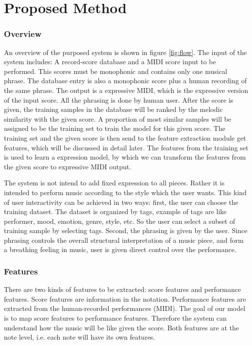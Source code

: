 \chapter{Proposed Method}
\subsection{Overview}
An overview of the purposed system is shown in figure \ref{fig:flow}. The input of the system includes: A record-score database and a MIDI score input to be performed. This scores must be monophonic and contains only one musical phrase. The database entry is also a monophonic score plus a human recording of the same phrase. The output is a expressive MIDI, which is the expressive version of the input score. All the phrasing is done by human user. 
After the score is given, the training samples in the database will be ranked by the melodic similarity with the given score. A proportion of most similar samples will be assigned to be the training set to train the model for this given score. The training set and the given score is then send to the feature extraction module get features, which will be discussed in detail later. The features from the training set is used to learn a expression model, by which we can transform the features from the given score to expressive MIDI output. 

The system is not intend to add fixed expression to all pieces. Rather it is intended to perform music according to the style which the user wants. This kind of user interactivity can be achieved in two ways: first, the user can choose the training dataset. The dataset is organized by tags, example of tags are like performer, mood, emotion, genre, style, etc. So the user can select a subset of training sample by selecting tags. Second, the phrasing is given by the user. Since phrasing controls the overall structural interpretation of a music piece, and form a breathing feeling in music, user is given direct control over the performance.


   \subsection{Features}
      There are two kinds of features to be extracted: score features and performance features. Score features are information in the notation. Performance features are extracted from the human-recorded performances (MIDI). The goal of our model is to map score features to performance features. Therefore the system can understand how the music will be like given the score. Both features are at the note level, i.e. each note will have its own features.
